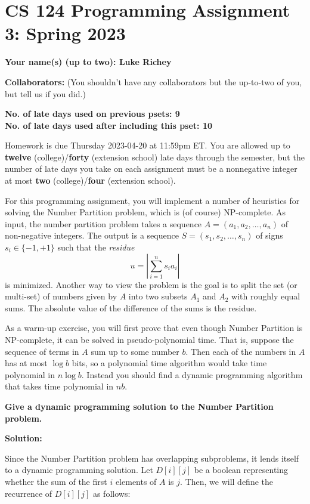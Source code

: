 \documentclass[11pt]{article}
\begin{document}
	
	\section*{CS 124 Programming Assignment 3: Spring 2023}
 		
	\textbf{Your name(s) (up to two): Luke Richey} 
		
	\textbf{Collaborators:} (You shouldn't have any collaborators but the up-to-two of you, but tell us if you did.)

	\textbf{No. of late days used on previous psets: 9}\\
	\textbf{No. of late days used after including this pset: 10}

Homework is due Thursday 2023-04-20 at 11:59pm ET. You are allowed up to {\bf twelve} (college)/{\bf forty} (extension school) late days through the semester, but the number of late days you take on each assignment must be a nonnegative integer at most {\bf two} (college)/{\bf four} (extension school).

For this programming assignment, you will implement a number of
heuristics for solving the {\sc Number Partition} problem, which is
(of course) NP-complete.  As input, the number partition problem
takes a sequence $A = (a_1,a_2,\ldots,a_n)$ of non-negative integers.  The output is a sequence $S = (s_1,s_2,\ldots,s_n)$ 
of signs $s_i \in \{-1,+1\}$ such that the {\em residue}
$$u = \left | \sum_{i=1}^n s_i a_i \right |$$ is minimized.  Another
way to view the problem is the goal is to split the set (or multi-set)
of numbers given by $A$ into two subsets $A_1$ and $A_2$ with roughly
equal sums.  The absolute value of the difference of the sums is the
residue.

As a warm-up exercise, you will first prove that even though Number
Partition is NP-complete, it can be solved in pseudo-polynomial time.
That is, suppose the sequence of terms in $A$ sum up to some number
$b$.  Then each of the numbers in $A$ has at most $\log b$ bits,
so a polynomial time algorithm would take time polynomial in 
$n \log b$.  Instead you should find a dynamic programming algorithm
that takes time polynomial in $nb$.  

\smallskip 
{\bf Give a dynamic programming solution to the Number Partition
problem.}

\textbf{Solution: }

Since the Number Partition problem has overlapping subproblems, it lends itself 
to a dynamic programming solution. Let $D[i][j]$ be a boolean representing 
whether the sum of the first $i$ elements of $A$ is $j$. Then, we will define 
the recurrence of $D[i][j]$ as follows:
\end{document}
